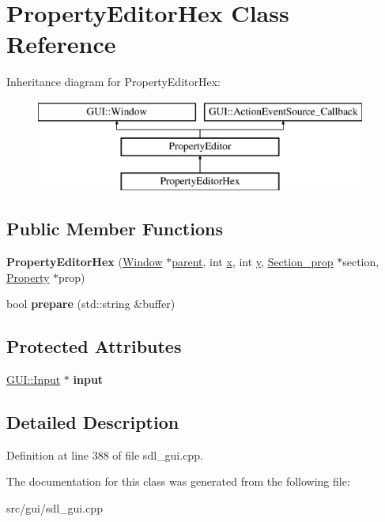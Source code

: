 \hypertarget{classPropertyEditorHex}{\section{Property\-Editor\-Hex Class Reference}
\label{classPropertyEditorHex}
}
Inheritance diagram for Property\-Editor\-Hex\-:\begin{figure}[H]
\begin{center}
\leavevmode
\includegraphics[height=3.000000cm]{classPropertyEditorHex}
\end{center}
\end{figure}
\subsection*{Public Member Functions}
\begin{DoxyCompactItemize}
\item 
\hypertarget{classPropertyEditorHex_a7a21b5b6314a5dcdc29d255ff231e84c}{{\bfseries Property\-Editor\-Hex} (\hyperlink{classGUI_1_1Window_ae828e9daa964dfc65a3550fb03117d30}{Window} $\ast$\hyperlink{classGUI_1_1Window_a2e593ff65e7702178d82fe9010a0b539}{parent}, int \hyperlink{classGUI_1_1Window_a6ca6a80ca00c9e1d8ceea8d3d99a657d}{x}, int \hyperlink{classGUI_1_1Window_a0ee8e923aff2c3661fc2e17656d37adf}{y}, \hyperlink{classSection__prop}{Section\-\_\-prop} $\ast$section, \hyperlink{classProperty}{Property} $\ast$prop)}\label{classPropertyEditorHex_a7a21b5b6314a5dcdc29d255ff231e84c}

\item 
\hypertarget{classPropertyEditorHex_aae67d8ec3c95b536a6fc01c40e5541e9}{bool {\bfseries prepare} (std\-::string \&buffer)}\label{classPropertyEditorHex_aae67d8ec3c95b536a6fc01c40e5541e9}

\end{DoxyCompactItemize}
\subsection*{Protected Attributes}
\begin{DoxyCompactItemize}
\item 
\hypertarget{classPropertyEditorHex_ae4aaff687f15bb4ca498899dcd1d1812}{\hyperlink{classGUI_1_1Input}{G\-U\-I\-::\-Input} $\ast$ {\bfseries input}}\label{classPropertyEditorHex_ae4aaff687f15bb4ca498899dcd1d1812}

\end{DoxyCompactItemize}


\subsection{Detailed Description}


Definition at line 388 of file sdl\-\_\-gui.\-cpp.



The documentation for this class was generated from the following file\-:\begin{DoxyCompactItemize}
\item 
src/gui/sdl\-\_\-gui.\-cpp\end{DoxyCompactItemize}
